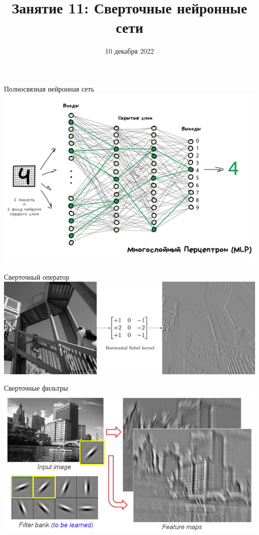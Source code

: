 \documentclass[aspectratio=169]{beamer}
\title{Занятие 11: Сверточные нейронные сети}
\date{10 декабря 2022}
\begin{document}
\maketitle

\begin{frame}{Полносвязная нейронная сеть}
    \centering
    \includegraphics[width=0.7\linewidth]{graphs/four_layers.jpg}
\end{frame}

\begin{frame}{Сверточный оператор}
    \centering
    \includegraphics[width=\linewidth]{graphs/sobel.png}
\end{frame}

\begin{frame}{Сверточные фильтры}
    \centering
    \includegraphics[width=0.85\linewidth]{graphs/conv_filter.png}
\end{frame}
\end{document}
